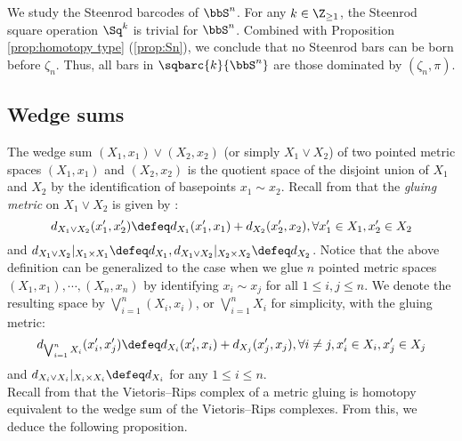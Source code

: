 \subsubsection{} We study the Steenrod barcodes of $\bbS^n$. For any $k\in \Z_{\geq 1}$, the Steenrod square operation $\Sq^k$ is trivial for $\bbS^n$. Combined with Proposition \ref{prop:homotopy type} (\ref{prop:Sn}), we conclude that no Steenrod bars can be born before $\zeta_n$. Thus, all bars in $\sqbarc{k}{\bbS^n}$ are those dominated by  $(\zeta_n,\pi)$.

\subsection{Wedge sums}

The wedge sum $(X_1,x_1)\vee (X_2,x_2)$ (or simply $X_1\vee X_2$) of two pointed metric spaces $(X_1,x_1)$ and $(X_2,x_2)$ is the quotient space of the disjoint union of $X_1$ and $X_2$ by the identification of basepoints $x_1\sim x_2$.
Recall from \cite{burago2001course} that the \emph{gluing metric} on $X_1\vee X_2$ is given by \label{para:gluing}: %
$$d_{X_1\vee X_2}(x_1',x_2')\defeq d_{X_1}(x_1',x_1)+d_{X_2}(x_2',x_2),\forall x_1'\in X_1, x_2'\in X_2$$
and $d_{X_1\vee X_2}\vert_{X_1\times X_1}\defeq d_{X_1},d_{X_1\vee X_2}\vert_{X_2\times X_2}\defeq d_{X_2}$. Notice that the above definition can be generalized to the case when we glue $n$ pointed metric spaces $(X_1,x_1),\cdots,(X_n,x_n)$ by identifying $x_i\sim x_j$ for all $1\leq i,j\leq n$. We denote the resulting space by $\bigvee_{i=1}^n (X_i,x_i)$, or $\bigvee_{i=1}^n X_i$ for simplicity, with the gluing metric:
$$d_{\bigvee_{i=1}^n X_i}(x_i',x_j')\defeq d_{X_i}(x_i',x_i)+d_{X_j}(x_j',x_j),\forall i\neq j, x_i'\in X_i, x_j'\in X_j$$
and $d_{X_i\vee X_i}|_{X_i\times X_i}\defeq d_{X_i}$ for any $1\leq i\leq n$.\\

Recall from \cite[Proposition 3.7]{adamaszek2020homotopy} that the Vietoris--Rips complex of a metric gluing is homotopy equivalent to the wedge sum of the Vietoris--Rips complexes. From this, we deduce the following proposition. 

